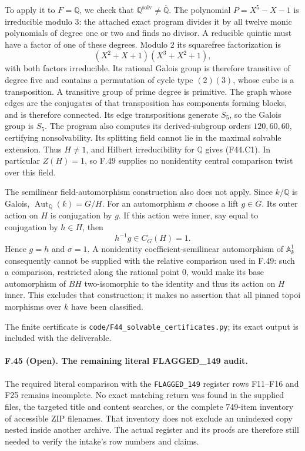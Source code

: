 To apply it to $F=\mathbb Q$, we check that
$\mathbb Q^{\mathrm{solv}}\ne\overline{\mathbb Q}$.
The polynomial $P=X^5-X-1$ is irreducible modulo $3$: the attached
exact program divides it by all twelve monic polynomials of degree
one or two and finds no divisor. A reducible quintic must have a
factor of one of these degrees. Modulo $2$ its squarefree
factorization is
\[
           (X^2+X+1)(X^3+X^2+1),
\]
with both factors irreducible. Its rational Galois group is therefore
transitive of degree five and contains a permutation of cycle type
$(2)(3)$, whose cube is a transposition. A transitive group of prime
degree is primitive. The graph whose edges are the conjugates of
that transposition has components forming blocks, and is therefore
connected. Its edge transpositions generate $S_5$, so the Galois
group is $S_5$. The program also computes its derived-subgroup
orders $120,60,60$, certifying nonsolvability. Its splitting field
cannot lie in the maximal solvable extension. Thus $H\ne1$, and
Hilbert irreducibility for $\mathbb Q$ gives (F44.C1).
In particular $Z(H)=1$, so F.49 supplies no nonidentity central
comparison twist over this field.

The semilinear field-automorphism construction also does not apply.
Since $k/\mathbb Q$ is Galois,
$\operatorname{Aut}_{\mathbb Q}(k)=G/H$. For an automorphism
$\sigma$ choose a lift $g\in G$. Its outer action on $H$ is
conjugation by $g$. If this action were inner, say equal to
conjugation by $h\in H$, then
\[
                       h^{-1}g\in C_G(H)=1.
\]
Hence $g=h$ and $\sigma=1$. A nonidentity coefficient-semilinear
automorphism of $\mathbb A^1_k$ consequently cannot be supplied with
the relative comparison used in F.49: such a comparison, restricted
along the rational point $0$, would make its base automorphism of
$BH$ two-isomorphic to the identity and thus its action on $H$
inner. This excludes that construction; it makes no assertion that
all pinned topoi morphisms over $k$ have been classified.

The finite certificate is
\texttt{code/F44\_solvable\_certificates.py}; its exact output is
included with the deliverable.


\paragraph{F.45 (Open). The remaining literal FLAGGED\_149 audit.}
The required literal comparison with the \texttt{FLAGGED\_149}
register rows F11--F16 and F25 remains incomplete. No exact matching
return was found in the supplied files, the targeted title and content
searches, or the complete 749-item inventory of accessible ZIP
filenames. That inventory does not exclude an unindexed copy nested
inside another archive. The actual register and its proofs are
therefore still needed to verify the intake's row numbers and claims.

